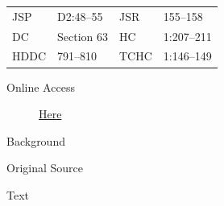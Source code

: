 {				\begin{tabular}{p{0.5in}p{1in}p{0.5in}p{1in}}
				JSP	 	& D2:48--55		& JSR 		& 155--158 \\
				DC	 	& Section 63 	& HC 		& 1:207--211 \\
				HDDC 	& 791--810		& TCHC 		& 1:146--149 \\
				\end{tabular}
			
			\begin{description}
				\item[Online Access] \href{https://www.josephsmithpapers.org/paper-summary/revelation-30-august-1831-dc-63/1}{Here}
			\end{description}
			
			\begin{description}
				\item[Background]
			\end{description}
			
			
			\begin{description}
				\item[Original Source]
			\end{description}
			
			
			\begin{description}
				\item[Text]
			\end{description}
			
}
